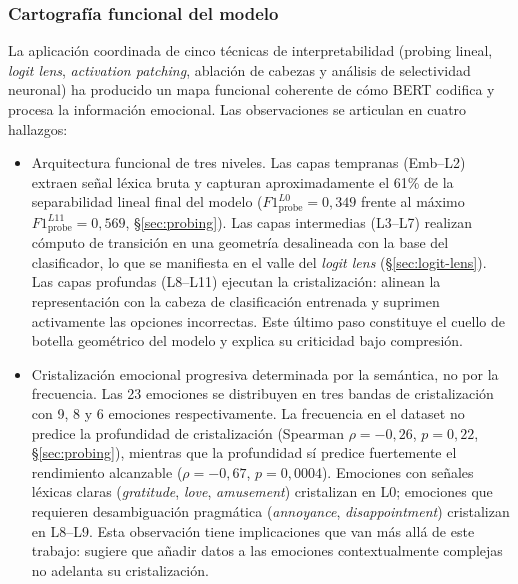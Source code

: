 \subsubsection{Cartografía funcional del modelo}

La aplicación coordinada de cinco técnicas de interpretabilidad (probing
lineal, \emph{logit lens}, \emph{activation patching}, ablación de cabezas y análisis de
selectividad neuronal) ha producido un mapa funcional coherente de cómo
BERT codifica y procesa la información emocional. Las observaciones se
articulan en cuatro hallazgos:

\begin{itemize}
  \item Arquitectura funcional de tres niveles. Las capas tempranas
        (Emb--L2) extraen señal léxica bruta y capturan aproximadamente el
        61\% de la separabilidad lineal final del modelo
        ($F1_{\text{probe}}^{L0} = 0{,}349$ frente al máximo
        $F1_{\text{probe}}^{L11} = 0{,}569$, \S\ref{sec:probing}). Las
        capas intermedias (L3--L7) realizan cómputo de transición en una
        geometría desalineada con la base del clasificador, lo que se
        manifiesta en el valle del \emph{logit lens} (\S\ref{sec:logit-lens}). Las
        capas profundas (L8--L11) ejecutan la cristalización: alinean la
        representación con la cabeza de clasificación entrenada y suprimen
        activamente las opciones incorrectas. Este último paso constituye el
        cuello de botella geométrico del modelo y explica su criticidad
        bajo compresión.

  \item Cristalización emocional progresiva determinada por la
        semántica, no por la frecuencia. Las 23 emociones se distribuyen en
        tres bandas de cristalización con 9, 8 y 6 emociones respectivamente.
        La frecuencia en el dataset no predice la profundidad de
        cristalización (Spearman $\rho = -0{,}26$, $p = 0{,}22$,
        \S\ref{sec:probing}), mientras que la profundidad sí predice
        fuertemente el rendimiento alcanzable
        ($\rho = -0{,}67$, $p = 0{,}0004$). Emociones con señales léxicas
        claras (\emph{gratitude}, \emph{love}, \emph{amusement}) cristalizan
        en L0; emociones que requieren desambiguación pragmática
        (\emph{annoyance}, \emph{disappointment}) cristalizan en L8--L9. Esta
        observación tiene implicaciones que van más allá de este trabajo:
        sugiere que añadir datos a las emociones contextualmente complejas no
        adelanta su cristalización.


\end{itemize}
